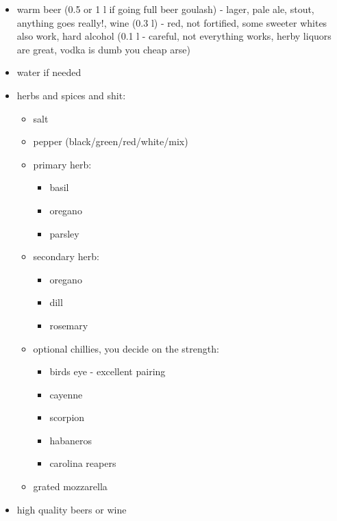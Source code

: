 \documentclass[10pt]{article}
\begin{document}
\begin{itemize}
\begin{itemize}
		\end{itemize}
	\item warm beer (0.5 or 1 l if going full beer goulash) - lager, pale ale, stout, anything goes really!, wine (0.3 l) - red, not fortified, some sweeter whites also work, hard alcohol (0.1 l - careful, not everything works, herby liquors are great, vodka is dumb you cheap arse)
	\item water if needed
	\item herbs and spices and shit:
		\begin{itemize}
			\item salt
			\item pepper (black/green/red/white/mix)
			\item primary herb:
				\begin{itemize}
					\item basil
					\item oregano
					\item parsley
				\end{itemize}
			\item secondary herb:
				\begin{itemize}
					\item oregano
					\item dill
					\item rosemary
				\end{itemize}
			\item optional chillies, you decide on the strength:
				\begin{itemize}
					\item birds eye - excellent pairing
					\item cayenne
					\item scorpion
					\item habaneros
					\item carolina reapers
				\end{itemize}
			\item grated mozzarella
		\end{itemize}
	\item high quality beers or wine
\end{itemize}
\end{document}
